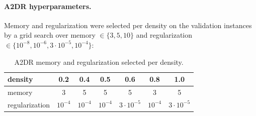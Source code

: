 \documentclass[final]{l4dc2026}
\begin{document}
\paragraph{A2DR hyperparameters.} Memory and regularization were selected per
density on the validation instances by a grid search over memory
$\in\{3,5,10\}$ and regularization $\in\{10^{-8},10^{-6},3\cdot10^{-5},10^{-4}\}$:

\begin{table}[H]
  \centering
  \caption{A2DR memory and regularization selected per density.}
  \label{tab:a2dr-hyper}
  \small
  \begin{tabular}{lcccccc}
    \toprule
    density & 0.2 & 0.4 & 0.5 & 0.6 & 0.8 & 1.0 \\
    \midrule
    memory & 3 & 5 & 5 & 5 & 3 & 5 \\
    regularization & $10^{-4}$ & $10^{-4}$ & $10^{-4}$ & $3\cdot10^{-5}$ & $10^{-4}$ & $3\cdot10^{-5}$ \\
    \bottomrule
  \end{tabular}
\end{table}
\end{document}
